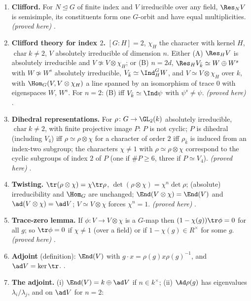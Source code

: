 \begin{enumerate}[label=\textbf{\thechapter.\arabic*}]
$W_{\bar k}\not\simeq W^s_{\bar k}$. \emph{(stated; reference for (a); proof sketched here for (b); proved here for (c))} .
\item \textbf{Clifford.} For $N\trianglelefteq G$ of finite index and $V$ irreducible over any field, $\Res_NV$ is semisimple, its constituents
form one $G$-orbit and have equal multiplicities. \emph{(proved here)} .
\item \textbf{Clifford theory for index $2$.} $[G:H]=2$, $\chi_H$ the character with kernel $H$, $\operatorname{char}k\ne2$, $V$ absolutely
irreducible of dimension $n$. Either (A) $\Res_HV$ is absolutely irreducible and $V\not\simeq V\otimes\chi_H$; or (B) $n=2d$,
$\Res_HV_{\bar k}\simeq W\oplus W^s$ with $W\not\simeq W^s$ absolutely irreducible, $V_{\bar k}\simeq\Ind_H^GW$, and $V\simeq V\otimes\chi_H$ over $k$, with
$\Hom_G(V,V\otimes\chi_H)$ a line spanned by an isomorphism of trace $0$ with eigenspaces $W$, $W^s$. For $n=2$: (B) iff
$V_{\bar k}\simeq\Ind\psi$ with $\psi^s\ne\psi$. \emph{(proved here)} .
\item \textbf{Dihedral representations.} For $\rho\colon G\to\GL_2(k)$ absolutely irreducible, $\operatorname{char}k\ne2$, with finite projective image
$P$: $P$ is not cyclic; $P$ is dihedral (including $V_4$) iff $\rho\simeq\rho\otimes\chi$ for a character of order $2$ iff $\rho_{\bar k}$ is induced
from an index-two subgroup; the characters $\chi\ne1$ with $\rho\simeq\rho\otimes\chi$ correspond to the cyclic subgroups of index $2$ of $P$
(one if $\#P\ge6$, three if $P\simeq V_4$). \emph{(proved here)} .
\item \textbf{Twisting.} $\tr(\rho\otimes\chi)=\chi\tr\rho$, $\det(\rho\otimes\chi)=\chi^n\det\rho$; (absolute) irreducibility and $\Hom_G$ are
unchanged; $\End(V\otimes\chi)=\End(V)$ and $\ad(V\otimes\chi)=\ad V$; $V\simeq V\otimes\chi$ forces $\chi^n=1$. \emph{(proved here)}
.
\item \textbf{Trace-zero lemma.} If $\phi\colon V\to V\otimes\chi$ is a $G$-map then $(1-\chi(g))\tr\phi=0$ for all $g$; so $\tr\phi=0$ if $\chi\ne1$ (over
a field) or if $1-\chi(g)\in R^\times$ for some $g$. \emph{(proved here)} .
\item \textbf{Adjoint} (definition): $\End(V)$ with $g\cdot x=\rho(g)x\rho(g)^{-1}$, and $\ad V=\ker\tr$. .
\item \textbf{The adjoint.} (i) $\End(V)=k\oplus\ad V$ if $n\in k^\times$; (ii) $\Ad\rho(g)$ has eigenvalues $\lambda_i/\lambda_j$, and on $\ad V$ for $n=2$:

\end{enumerate}
